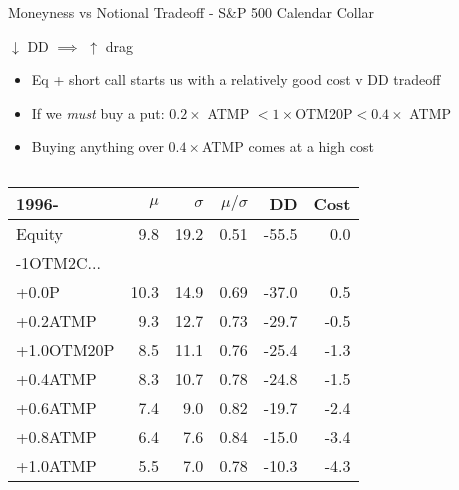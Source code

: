 \documentclass{beamer}
\begin{document}
\begin{frame}{Moneyness vs Notional Tradeoff - S\&P 500 Calendar Collar}
\begin{block}{$\downarrow$ DD $\implies$ $\uparrow$ drag}
\begin{itemize}
\item Eq + short call starts us with a relatively good cost v DD tradeoff
\item If we {\em must} buy a put: $0.2\times$ ATMP $< 1\times$OTM20P$ < 0.4\times$ ATMP
\item Buying anything over $0.4\times$ATMP comes at a high cost
\end{itemize}
\end{block}

\begin{columns}

\begin{column}{0.5\textwidth}

\scalebox{0.7} {

\begin{tabular}{lrrrrr}
\toprule
1996- & $\mu$ & $\sigma$ & $\mu/\sigma$ & DD & Cost \\
\midrule
Equity & 9.8 & 19.2 & 0.51 & -55.5 & 0.0\\
\addlinespace
-1OTM2C...\\
+0.0P & 10.3 & 14.9 & 0.69 & -37.0 & 0.5\\
+0.2ATMP & 9.3 & 12.7 & 0.73 & -29.7 & -0.5\\
+1.0OTM20P & 8.5 & 11.1 & 0.76 & -25.4 & -1.3\\
+0.4ATMP & 8.3 & 10.7 & 0.78 & -24.8 & -1.5\\
+0.6ATMP & 7.4 & 9.0 & 0.82 & -19.7 & -2.4\\
+0.8ATMP & 6.4 & 7.6 & 0.84 & -15.0 & -3.4\\
+1.0ATMP & 5.5 & 7.0 & 0.78 & -10.3 & -4.3\\
\bottomrule
\end{tabular}

}

\end{column}

\begin{column}{0.5\textwidth}

\scalebox{0.7} {


}
\end{column}
\end{columns}
\end{frame}
\end{document}
